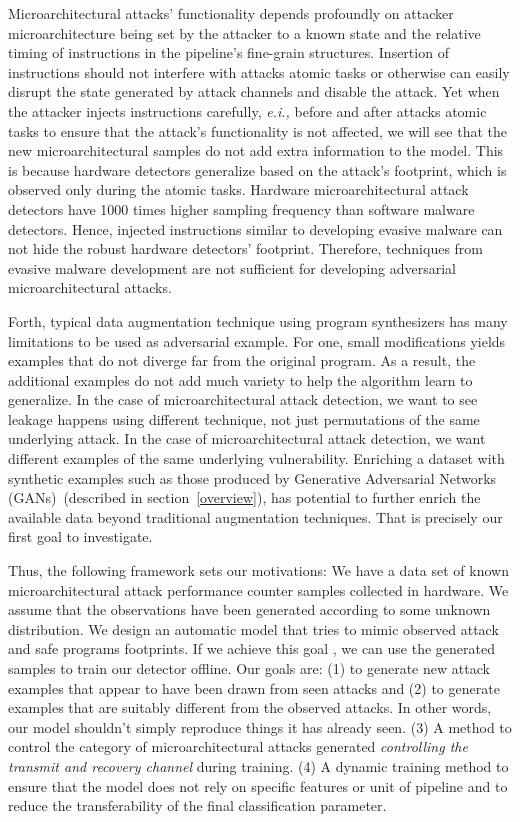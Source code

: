 Microarchitectural attacks' functionality depends profoundly on attacker microarchitecture being set by the attacker to a known state and the relative timing of instructions in the pipeline's fine-grain structures. 
Insertion of instructions should not interfere with attacks atomic tasks or otherwise can easily disrupt the state generated by attack channels and disable the attack. Yet when the attacker injects instructions carefully, {\em e.i.,} before and after attacks atomic tasks to ensure that the attack's functionality is not affected, we will see that the new microarchitectural samples do not add extra information to the model. This is because hardware detectors generalize based on the attack's footprint, which is observed only during the atomic tasks. Hardware microarchitectural attack detectors have 1000 times higher sampling frequency than software malware detectors. Hence, injected instructions similar to developing evasive malware can not hide the robust hardware detectors' footprint. Therefore,  techniques from evasive malware development are not sufficient for developing adversarial microarchitectural attacks. 

Forth,  
typical data augmentation technique using program synthesizers has many limitations to be used as adversarial example. For one, small modifications yields examples that do not diverge far from the original program. As a result, the additional examples do not add much variety to help the algorithm learn to generalize. In the case of microarchitectural attack detection, we want to see leakage happens using different technique, not just permutations of the same underlying attack.
In the case of microarchitectural attack detection, we want different examples of the same underlying vulnerability. Enriching a dataset with synthetic examples such as those produced by Generative Adversarial Networks (GANs)~\cite{goodfellow2014generative}(described in section~\ref{overview}), has potential to further enrich the available data beyond traditional augmentation techniques. That is precisely our first goal to investigate. 

 
 Thus, the following framework sets our motivations:
  We have a data set of known   microarchitectural attack performance counter samples collected in hardware. 
 We assume that the observations have been generated according to some unknown distribution. 
 We design an automatic model that tries to mimic observed attack and safe programs footprints. If we achieve this goal , we can use the generated samples to train our detector offline. Our goals are: (1) to generate new attack examples that appear to have been drawn from seen attacks and (2) to generate examples that are suitably different from the observed attacks. In other words, our model shouldn't simply reproduce things it has already seen. (3) A method to control the category of microarchitectural attacks generated {\em controlling the transmit and recovery channel} during training. (4) A dynamic training method to ensure that the model does not rely on specific features or unit of pipeline and to reduce the  transferability of the final classification parameter. 
 
